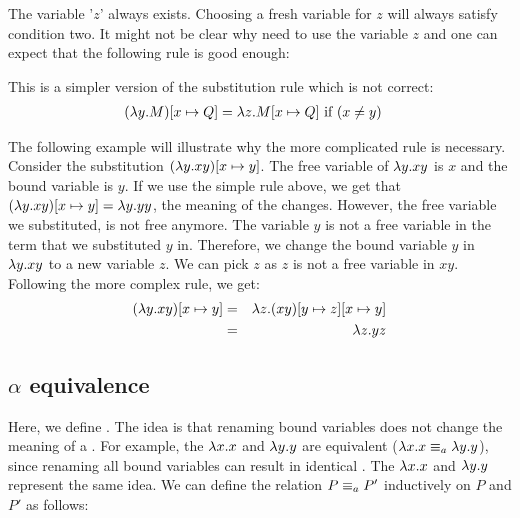   



The variable '$z$' always exists. Choosing a fresh variable for $z$ will always satisfy condition two.
It might not be clear why need to use the variable $z$ and one can expect that the following rule is good enough:
\begin{definition}
	This is a simpler version of the substitution rule which is not correct:
	\label{def:simple-substitution}
	\begin{align*}
		(\lambda {y}.{M}) [{x}\mapsto{Q}] &= \lambda {z}.{M [{x}\mapsto{Q}]} \text{ if } (x \neq y)
	\end{align*}
\end{definition}

The following example will illustrate why the more complicated rule is necessary.
Consider the substitution $(\lambda {y}.{xy})[{x}\mapsto{y}]$. The free variable of \lterm $\lambda {y}.{xy}$ is $x$ and the bound variable is $y$.
If we use the simple rule above, we get that $(\lambda {y}.{xy})[{x}\mapsto{y}] = \lambda {y}.{yy}$, the meaning of the \lterm changes. 
However, the free variable we substituted, is not free anymore. The variable $y$ is not a free variable in the term that we substituted $y$ in.
Therefore, we change the bound variable $y$ in $\lambda {y}.{xy}$ to a new variable $z$. We can pick $z$ as $z$ is not a free variable in $xy$.
Following the more complex rule, we get: 
\begin{eqnarray*}
	(\lambda {y}.{xy})[{x}\mapsto{y}] &=& \lambda {z}.{(xy)[{y}\mapsto{z}][{x}\mapsto{y}]} \\
	&=& \lambda {z}.{yz}
\end{eqnarray*}

\subsection{\texorpdfstring{\boldmath${\alpha}$ equivalence}{Alpha equivalence}}
Here, we define \aeq. The idea is that renaming bound variables does not change the meaning of a \lterm.
For example, the \lterms $\lambda {x}.{x}$ and $\lambda {y}.{y}$ are equivalent ($\lambda {x}.{x} \equiv_a \lambda {y}.{y}$), since renaming all bound variables can result in identical \lterms.
The \lterms $\lambda {x}.{x}$ and $\lambda {y}.{y}$ represent the same idea.
We can define the relation $P \equiv_a P'$ inductively on $P$ and $P'$ as follows:

